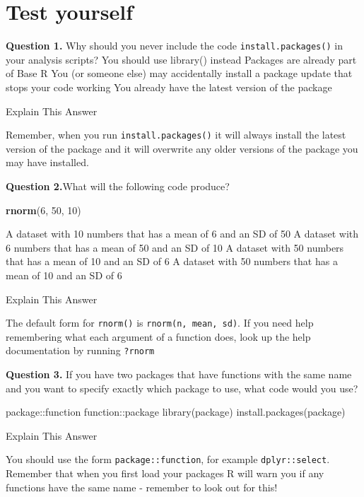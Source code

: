 \documentclass[]{book}
\newenvironment{Shaded}{\begin{snugshade}}{\end{snugshade}}
\newcommand{\DecValTok}[1]{\textcolor[rgb]{0.00,0.00,0.81}{#1}}
\newcommand{\KeywordTok}[1]{\textcolor[rgb]{0.13,0.29,0.53}{\textbf{#1}}}
\newcommand{\NormalTok}[1]{#1}
\begin{document}
\hypertarget{test-yourself}{%
\section{Test yourself}\label{test-yourself}}

\textbf{Question 1.} Why should you never include the code \texttt{install.packages()} in your analysis scripts? You should use library() instead Packages are already part of Base R You (or someone else) may accidentally install a package update that stops your code working You already have the latest version of the package

Explain This Answer

Remember, when you run \texttt{install.packages()} it will always install the latest version of the package and it will overwrite any older versions of the package you may have installed.

\textbf{Question 2.}What will the following code produce?

\begin{Shaded}
\begin{Highlighting}[]
\KeywordTok{rnorm}\NormalTok{(}\DecValTok{6}\NormalTok{, }\DecValTok{50}\NormalTok{, }\DecValTok{10}\NormalTok{)}
\end{Highlighting}
\end{Shaded}

 A dataset with 10 numbers that has a mean of 6 and an SD of 50 A dataset with 6 numbers that has a mean of 50 and an SD of 10 A dataset with 50 numbers that has a mean of 10 and an SD of 6 A dataset with 50 numbers that has a mean of 10 and an SD of 6

Explain This Answer

The default form for \texttt{rnorm()} is \texttt{rnorm(n,\ mean,\ sd)}. If you need help remembering what each argument of a function does, look up the help documentation by running \texttt{?rnorm}

\textbf{Question 3.} If you have two packages that have functions with the same name and you want to specify exactly which package to use, what code would you use?

 package::function function::package library(package) install.packages(package)

Explain This Answer

You should use the form \texttt{package::function}, for example \texttt{dplyr::select}. Remember that when you first load your packages R will warn you if any functions have the same name - remember to look out for this!
\end{document}
